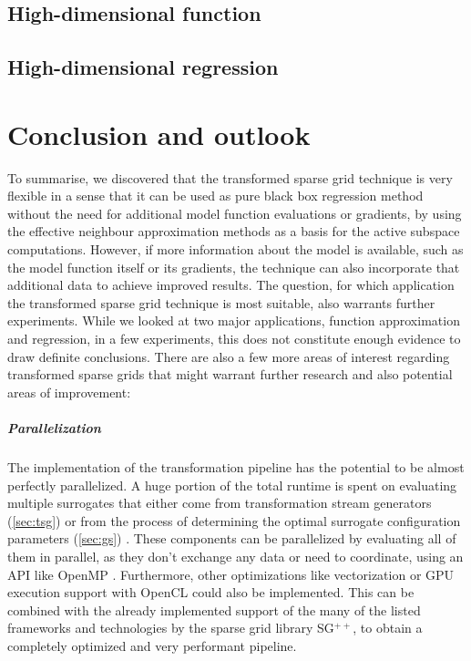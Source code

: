 \documentclass[
  a4paper,  %
  twoside,  %
  bibliography=totoc,
  headsepline,
  cleardoublepage=empty,
  parskip=half,
  draft=false
]{scrbook}
\begin{document}
\section{High-dimensional function}
\section{High-dimensional regression}

\chapter{Conclusion and outlook}
\label{chap:c9}

To summarise, we discovered that the transformed sparse grid technique is very flexible in a sense that it can be used as pure black box regression method without the need for additional model function evaluations or gradients, by using the effective neighbour approximation methods as a basis for the active subspace computations.
However, if more information about the model is available, such as the model function itself or its gradients, the technique can also incorporate that additional data to achieve improved results.
The question, for which application the transformed sparse grid technique is most suitable, also warrants further experiments.
While we looked at two major applications, function approximation and regression, in a few experiments, this does not constitute enough evidence to draw definite conclusions.
There are also a few more areas of interest regarding transformed sparse grids that might warrant further research and also potential areas of improvement:

\paragraph{Parallelization}
The implementation of the transformation pipeline has the potential to be almost perfectly parallelized.
A huge portion of the total runtime is spent on evaluating multiple surrogates that either come from transformation stream generators (\cref{sec:tsg}) or from the process of determining the optimal surrogate configuration parameters (\cref{sec:gs}) .
These components can be parallelized by evaluating all of them in parallel, as they don't exchange any data or need to coordinate, using an API like OpenMP \cite{openmp08}.
Furthermore, other optimizations like vectorization \cite{Maleki2011} or GPU execution support with OpenCL \cite{Stone2010} could also be implemented.
This can be combined with the already implemented support of the many of the listed frameworks and technologies by the sparse grid library SG$^{++}$, to obtain a completely optimized and very performant pipeline.
\end{document}
